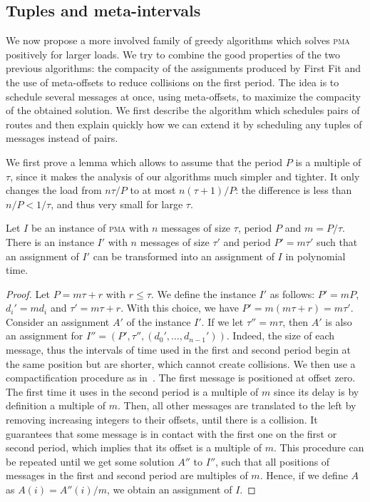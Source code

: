 \documentclass[a4paper,UKenglish,cleveref, autoref, thm-restate]{lipics-v2019}
\newcommand\pma{\textsc{pma}\xspace}
\begin{document}
\subsection{Tuples and meta-intervals}

We now propose a more involved family of greedy algorithms which 
solves \pma positively for larger loads. We try to combine the good properties of the two previous algorithms: the compacity of the assignments produced by First Fit and the use of meta-offsets to reduce collisions on the first period. The idea is to schedule several messages at once, using meta-offsets, to maximize the compacity of the obtained solution. 
We first describe the algorithm which schedules pairs of routes and then explain quickly how we can extend it by scheduling any tuples of messages instead of pairs.

We first prove a lemma which allows to assume that the period $P$ is a multiple of $\tau$, since it makes the analysis of our algorithms much simpler and tighter. It only changes the load from $n \tau / P$ to at most $n (\tau +1)/ P$: the difference is less than $n /P < 1/\tau$, and thus very small for large $\tau$.

\begin{lemma}
Let $I$ be an instance of \pma with $n$ messages of size $\tau$, period $P$ and $m = P / \tau$. There is an instance $I'$ with $n$ messages of size $\tau'$ and period $P'= m\tau'$ such that an assignment of $I'$ can be transformed into an assignment of $I$ in polynomial time.
\end{lemma}
\begin{proof}
Let $P = m \tau + r$ with $r \leq \tau$. We define the instance $I'$ as follows: $P' = mP$, $d_{i}' = m d_i$ and $\tau' = m \tau + r$. With this choice, we have $P' = m(m \tau + r) = m \tau'$.
Consider an assignment $A'$ of the instance $I'$.
If we let $\tau'' = m\tau$, then $A'$ is also an assignment for $I'' = (P',\tau'',(d_{0}',\dots,d_{n-1}'))$. Indeed, the size of each message, thus the intervals of time used in the first and second period begin at the same position but are shorter, which cannot create collisions.
We then use a compactification procedure as in~\cite{barth2018deterministic}. The first message is positioned at offset zero. The first time it uses in the second period is a multiple of $m$ since its delay is by definition a multiple of $m$. Then, all other messages are translated to the left by removing increasing integers to their offsets, until there is a collision. It guarantees that some message is in contact with the first one on the first or second period,  which implies that its offset is a multiple of $m$. This procedure can be repeated until we get some solution $A''$ to $I''$, such that all positions of messages in the first and second period are multiples of $m$. Hence, if we define $A$ as $A(i) = A''(i)/m$, we obtain an assignment of $I$.
\end{proof}
\end{document}
